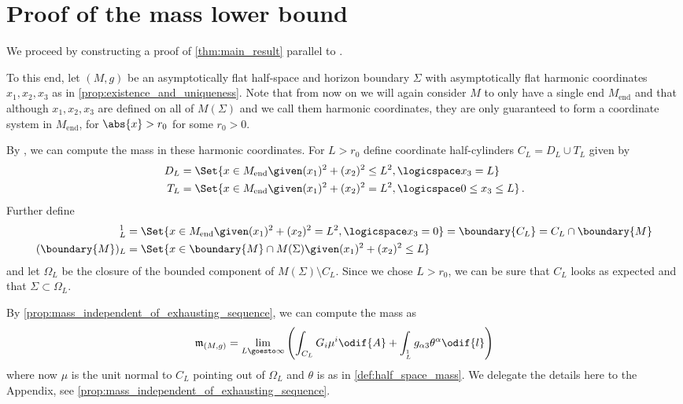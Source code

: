 \documentclass[titlepage,numbers=noenddot,oneside,%
cleardoublepage=empty,paper=a4,fontsize=11pt,%
english,%
]{scrartcl}
\newcommand*{\mathfullstop}{\,.}
\let\sphere\relax
\newcommand{\sphere}{\mathbb{S}}
\newcommand{\Mend}{M_{\mathrm{end}}} %
\newcommand{\mass}[2]{\mathfrak{m}_{(#1,#2)}} %
\begin{document}
\section{Proof of the mass lower bound}\label{sec:proof_of_lower_bound}
We proceed by constructing a proof of \cref{thm:main_result} parallel to \cite[Section 6]{brayHarmonicFunctionsMass2019}.%

To this end, let \( (M,g) \) be an asymptotically flat half-space and horizon boundary \( \Sigma \) with asymptotically flat harmonic coordinates \( x_1,x_2,x_3 \) as in \cref{prop:existence_and_uniqueness}. Note that from now on we will again consider \( M \) to only have a single end \( \Mend \) and that although \( x_1,x_2,x_3 \) are defined on all of \( M(\Sigma) \) and we call them harmonic coordinates, they are only guaranteed to form a coordinate system in \( \Mend \), \ie for \( \abs{x}>r_0 \) for some \( r_0>0 \).

By \cite[Proposition 3.7]{almarazPositiveMassTheorem2016}, we can compute the mass in these harmonic coordinates. For \( L>r_0 \) define coordinate half-cylinders \( C_L=D_L\cup T_L \) given by
\begin{align*}
    D_L&=\Set{x\in \Mend\given (x_1)^2+(x_2)^2\leq L^2,\logicspace x_3=L}\\
    T_L&=\Set{x\in \Mend\given (x_1)^2+(x_2)^2=L^2,\logicspace 0\leq x_3\leq L}\mathfullstop
\end{align*}
Further define
\begin{align*}
    \sphere_L^1&=\Set{x\in \Mend \given (x_1)^2+(x_2)^2=L^2,\logicspace x_3=0}=\boundary{C_L}=C_L\cap \boundary{M}\\
    (\boundary{M})_L&=\Set{x\in \boundary{M}\cap M(\Sigma)\given (x_1)^2+(x_2)^2\leq L}
\end{align*}
and let \( \Omega_L \) be the closure of the bounded component of \( M(\Sigma)\setminus C_L \). Since we chose \( L>r_0 \), we can be sure that \( C_L  \) looks as expected and that \( \Sigma\subset \Omega_L \).

By \cref{prop:mass_independent_of_exhausting_sequence}, we can compute the mass as
\begin{equation*}
    \mass{M}{g}=\lim_{L \goesto \infty}\left( \int_{C_L}G_i  \mu^i\odif{A}+\int_{\sphere^1_L}g_{\alpha 3}\theta^\alpha\odif{l} \right)
\end{equation*}
where now \( \mu \) is the unit normal to \( C_L \) pointing out of \( \Omega_L \) and \( \theta \) is as in \cref{def:half_space_mass}. We delegate the details here to the Appendix, see \cref{prop:mass_independent_of_exhausting_sequence}.
\end{document}
